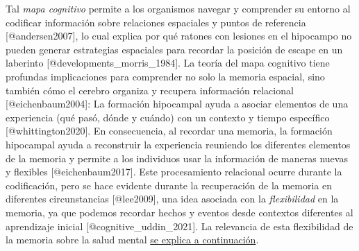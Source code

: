 \documentclass[
  11pt]{../MastersDoctoralThesisUNAM}
\begin{document}
Tal \emph{mapa cognitivo} permite a los organismos navegar y comprender
su entorno al codificar información sobre relaciones espaciales y puntos
de referencia {[}@andersen2007{]}, lo cual explica por qué ratones con
lesiones en el hipocampo no pueden generar estrategias espaciales para
recordar la posición de escape en un laberinto
{[}@developments\_morris\_1984{]}. La teoría del mapa cognitivo tiene
profundas implicaciones para comprender no solo la memoria espacial,
sino también cómo el cerebro organiza y recupera información relacional
{[}@eichenbaum2004{]}: La formación hipocampal ayuda a asociar elementos
de una experiencia (qué pasó, dónde y cuándo) con un contexto y tiempo
específico {[}@whittington2020{]}. En consecuencia, al recordar una
memoria, la formación hipocampal ayuda a reconstruir la experiencia
reuniendo los diferentes elementos de la memoria y permite a los
individuos usar la información de maneras nuevas y flexibles
{[}@eichenbaum2017{]}. Este procesamiento relacional ocurre durante la
codificación, pero se hace evidente durante la recuperación de la
memoria en diferentes circunstancias {[}@lee2009{]}, una idea asociada
con la \emph{flexibilidad} en la memoria, ya que podemos recordar hechos
y eventos desde contextos diferentes al aprendizaje inicial
{[}@cognitive\_uddin\_2021{]}. La relevancia de esta flexibilidad de la
memoria sobre la salud mental \hyperref[callout-reconsolidacion]{se
explica a continuación}.
\end{document}
